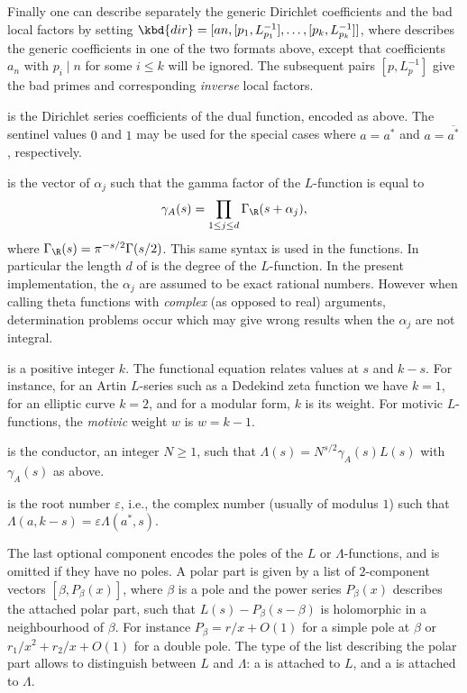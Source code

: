 Finally one can describe separately the generic Dirichlet coefficients
and the bad local factors by setting $\kbd{dir} = [an, [p_1,L^{-1}_{p_1}],
\dots,[p_k,L^{-1}_{p_k}]]$, where  describes the generic coefficients
in one of the two formats above, except that coefficients $a_n$ with
$p_i \mid n$ for some $i \leq k$ will be ignored. The subsequent pairs $[p,
L_p^{-1}]$ give the bad primes and corresponding \emph{inverse} local
factors.

\item {} is the Dirichlet series coefficients of the dual
function, encoded as  above. The sentinel values $0$ and $1$ may
be used for the special cases where $a = a^*$ and $a = \overline{a^*}$,
respectively.

\item {} is the vector of $\alpha_j$ such that the gamma
factor of the $L$-function is equal to
$$\gamma_A(s)=\prod_{1\le j\le d}\Gamma_{\R}(s+\alpha_j),$$
where $\Gamma_{\R}(s)=\pi^{-s/2}\Gamma(s/2)$.
This same syntax is used in the  functions.
In particular the length $d$ of  is the degree of the $L$-function.
In the present implementation, the $\alpha_j$ are assumed to be exact
rational numbers. However when calling theta functions with \emph{complex}
(as opposed to real) arguments, determination problems occur which may
give wrong results when the $\alpha_j$ are not integral.

\item {} is a positive integer $k$. The functional equation relates
values at $s$ and $k-s$. For instance, for an Artin $L$-series such as a
Dedekind zeta function we have $k = 1$, for an elliptic curve $k = 2$, and
for a modular form, $k$ is its weight. For motivic $L$-functions, the
\emph{motivic} weight $w$ is $w = k-1$.

\item {} is the conductor, an integer $N\ge1$, such that
$\Lambda(s)=N^{s/2}\gamma_A(s)L(s)$ with $\gamma_A(s)$ as above.

\item {} is the root number $\varepsilon$, i.e., the
complex number (usually of modulus $1$) such that
$\Lambda(a, k-s) = \varepsilon \Lambda(a^*, s)$.

\item The last optional component  encodes the poles of the
$L$ or $\Lambda$-functions, and is omitted if they have no poles.
A polar part is given by a list of $2$-component vectors
$[\beta,P_{\beta}(x)]$, where
$\beta$ is a pole and the power series $P_{\beta}(x)$ describes
the attached polar part, such that $L(s) - P_\beta(s-\beta)$ is holomorphic
in a neighbourhood of $\beta$. For instance $P_\beta = r/x+O(1)$ for a
simple pole at $\beta$ or $r_1/x^2+r_2/x+O(1)$ for a double pole.
The type of the list describing the polar part allows to distinguish between
$L$ and $\Lambda$: a  is attached to $L$, and a 
is attached to $\Lambda$.


